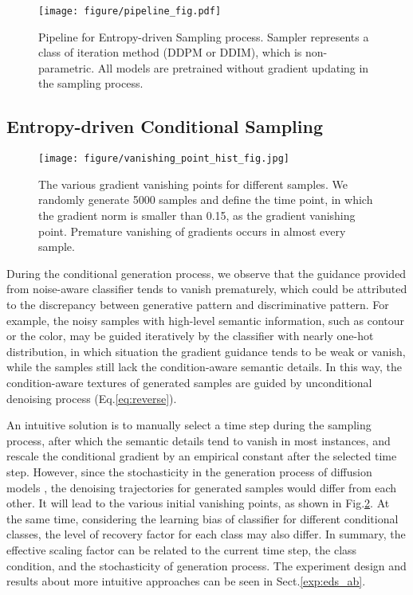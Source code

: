 \documentclass[runningheads]{llncs}
\begin{document}
\begin{figure}[t]
    \begin{center}
    \texttt{[image: figure/pipeline\_fig.pdf]}
\caption{Pipeline for Entropy-driven Sampling process. Sampler represents a class of iteration method (DDPM or DDIM), which is non-parametric. All models are pretrained without gradient updating in the sampling process.}\label{fig:pipeline}
    \end{center}
    \vskip -0.2in
\end{figure} \subsection{Entropy-driven Conditional Sampling}
\label{md:eds}

\begin{figure}[t!]
    \begin{center}
    \texttt{[image: figure/vanishing\_point\_hist\_fig.jpg]}
    \caption{The various gradient vanishing points for different samples. We randomly generate 5000 samples and define the time point, in which the gradient norm is smaller than 0.15, as the gradient vanishing point. Premature vanishing of gradients occurs in almost every sample.}\label{fig:vanishing_hist}
    \end{center}
    \vskip -0.3in
\end{figure} During the conditional generation process, we observe that the guidance provided from noise-aware classifier tends to vanish prematurely,
which could be attributed to the discrepancy between generative pattern and discriminative pattern.
For example, the noisy samples with high-level semantic information, such as contour or the color, may be guided iteratively by the classifier with nearly one-hot distribution,
in which situation the gradient guidance tends to be weak or vanish, while the samples still lack the condition-aware semantic details. 
In this way, the condition-aware textures of generated samples are guided by unconditional denoising process (Eq.\eqref{eq:reverse}).





An intuitive solution is to manually select a time step during the sampling process, after which the semantic details tend to vanish in most instances, and rescale the conditional gradient by an empirical constant after the selected time step.
However, since the stochasticity in the generation process of diffusion models \cite{choi2021ilvr},
the denoising trajectories for generated samples would differ from each other. 
It will lead to the various initial vanishing points, as shown in Fig.\ref{fig:vanishing_hist}.
At the same time, considering the learning bias of classifier for different conditional classes, the level of recovery factor for each class may also differ.
In summary, the effective scaling factor can be related to the current time step, the class condition, and the stochasticity of generation process.
The experiment design and results about more intuitive approaches can be seen in Sect.\ref{exp:eds_ab}.
\end{document}
